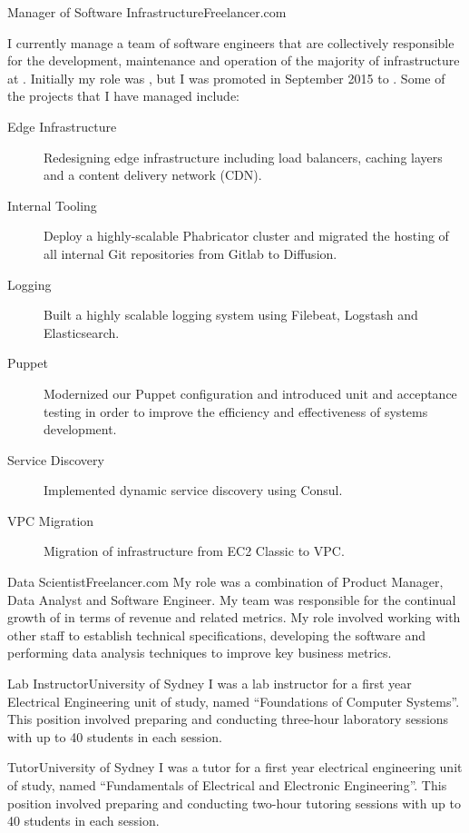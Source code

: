 \begin{professionalExperience}

{Manager of Software Infrastructure}{Freelancer.com}
{
  I currently manage a team of software engineers that are collectively
  responsible for the development, maintenance and operation of the majority of
  infrastructure at . Initially my role was
  , but I was promoted in September
  2015 to . Some of the projects
  that I have managed include:

  \begin{description}
    \item[Edge Infrastructure] Redesigning edge infrastructure including load
      balancers, caching layers and a content delivery network (CDN).
    \item[Internal Tooling] Deploy a highly-scalable Phabricator cluster and
      migrated the hosting of all internal Git repositories from Gitlab to
      Diffusion.
    \item[Logging] Built a highly scalable logging system using Filebeat,
      Logstash and Elasticsearch.
    \item[Puppet] Modernized our Puppet configuration and introduced unit and
      acceptance testing in order to improve the efficiency and effectiveness of
      systems development.
    \item[Service Discovery] Implemented dynamic service discovery using Consul.
    \item[VPC Migration] Migration of infrastructure from EC2 Classic to VPC.
  \end{description}
}

{Data Scientist}{Freelancer.com}
{My role was a combination of Product Manager, Data Analyst and Software
Engineer. My team was responsible for the continual growth of
 in terms of revenue and related metrics. My role
involved working with other staff to establish technical specifications,
developing the software and performing data analysis techniques to improve key
business metrics.}

{Lab Instructor}{University of Sydney}
{I was a lab instructor for a first year Electrical Engineering unit of study,
named ``Foundations of Computer Systems''. This position involved preparing
and conducting three-hour laboratory sessions with up to 40 students in each
session.}

{Tutor}{University of Sydney}
{I was a tutor for a first year electrical engineering unit of study, named
``Fundamentals of Electrical and Electronic Engineering''. This position
involved preparing and conducting two-hour tutoring sessions with up to 40
students in each session.}

\end{professionalExperience}
